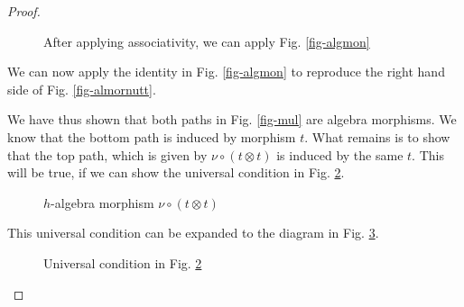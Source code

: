 \documentclass[letterpaper, 10 pt, conference]{ieeeconf}
\begin{document}
\begin{proof}
\begin{figure}[H]
\caption{After applying associativity, we can apply Fig. \ref{fig-algmon}}
\label{fig-almornutt2}
\end{figure}

We can now apply the identity in Fig. \ref{fig-algmon} to reproduce the right hand side of Fig. \ref{fig-almornutt}.

We have thus shown that both paths in Fig. \ref{fig-mul} are algebra morphisms. We know that the bottom path is induced by morphism $t$. What remains is to show that the top path, which is given by $\nu \circ (t \otimes t)$ is induced by the same $t$. This will be true, if we can show the universal condition in Fig. \ref{fig-monmul2}.


\begin{figure}[H]
\centering
{}
\caption{$h$-algebra morphism $\nu \circ (t \otimes t)$}
\label{fig-monmul2}
\end{figure}

This universal condition can be expanded to the diagram in Fig. \ref{fig-uni2}.

\begin{figure}[H]
\centering
{}
\caption{Universal condition in Fig. \ref{fig-monmul2}}
\label{fig-uni2}
\end{figure}


\end{proof}
\end{document}
